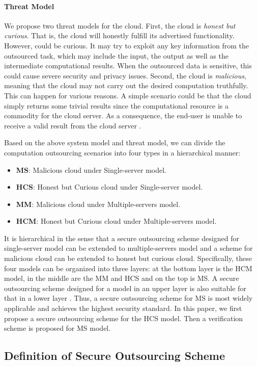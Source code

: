 \documentclass[english,draftcls,onecolumn,11pt]{IEEEtran}
\theoremstyle{definition}
\theoremstyle{plain}
\theoremstyle{plain}
\theoremstyle{definition}
\begin{document}
\paragraph{Threat Model}

We propose two threat models for the cloud. First, the cloud 
is \textit{honest but curious}. That is, the cloud will honestly fulfill
its advertised functionality. However,  could be curious. It may
try to exploit any key information from the outsourced task, which
may include the input, the output as well as the intermediate computational
results. When the outsourced data is sensitive, this could cause severe
security and privacy issues. Second, the cloud  is \textit{malicious},
meaning that the cloud  may not carry out the desired computation
truthfully. This can happen for various reasons. A simple scenario
could be that the cloud simply returns some trivial results since
the computational resource is a commodity for the cloud server. As
a consequence, the end-user  is unable to receive a valid result
from the cloud server . 

Based on the above system model and threat model, we can divide the
computation outsourcing scenarios into four types in a hierarchical
manner: 
\begin{itemize}
\item \textbf{MS}: Malicious cloud under Single-server model. 
\item \textbf{HCS}: Honest but Curious cloud under Single-server model.
\item \textbf{MM}: Malicious cloud under Multiple-servers model.
\item \textbf{HCM}: Honest but Curious cloud under Multiple-servers model. 
\end{itemize}
It is hierarchical in the sense that a secure outsourcing scheme designed
for single-server model can be extended to multiple-servers model
and a scheme for malicious cloud can be extended to honest but curious
cloud. Specifically, these four models can be organized into three
layers: at the bottom layer is the HCM model, in the middle are the
MM and HCS and on the top is MS. A secure outsourcing scheme designed
for a model in an upper layer is also suitable for that in a lower
layer . Thus, a secure outsourcing scheme for MS is most widely applicable
and achieves the highest security standard. In this paper, we first
propose a secure outsourcing scheme for the HCS model. Then a verification
scheme is proposed for MS model.


\subsection{Definition of Secure Outsourcing Scheme}
\end{document}
